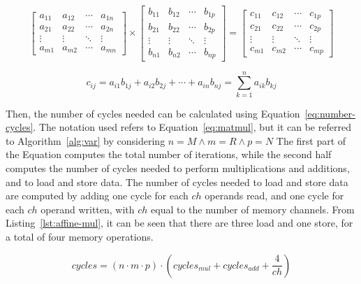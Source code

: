 \begin{equation}
        \label{eq:matmul}
    \begin{bmatrix}
     a_{11} & a_{12} & \cdots & a_{1n}\\
     a_{21} & a_{22} & \cdots & a_{2n}\\
     \vdots & \vdots & \ddots & \vdots\\
     a_{m1} & a_{m2} & \cdots & a_{mn}
 \end{bmatrix}
 \times
 \begin{bmatrix}
     b_{11} & b_{12} & \cdots & b_{1p}\\
     b_{21} & b_{22} & \cdots & b_{2p}\\
     \vdots & \vdots & \ddots & \vdots\\
     b_{n1} & b_{n2} & \cdots & b_{np}
 \end{bmatrix}
  =
 \begin{bmatrix}
     c_{11} & c_{12} & \cdots & c_{1p}\\
     c_{21} & c_{22} & \cdots & c_{2p}\\
     \vdots & \vdots & \ddots & \vdots\\
     c_{m1} & c_{m2} & \cdots & c_{mp}
 \end{bmatrix}
\end{equation}

\begin{equation}
    \label{eq:matmul-element}
    c_{ij}= a_{i1} b_{1j} + a_{i2} b_{2j} +\cdots+ a_{in} b_{nj} = \sum_{k=1}^n a_{ik}b_{kj}
\end{equation}

Then, the number of cycles needed can be calculated using Equation~\ref{eq:number-cycles}.
The notation used refers to Equation~\ref{eq:matmul}, but it can be referred to Algorithm~\ref{alg:var} by considering $n = M \land m=R \land p=N$
The first part of the Equation computes the total number of iterations, while the second half computes the number of cycles needed to perform multiplications and additions, and to load and store data.
The number of cycles needed to load and store data are computed by adding one cycle for each $ch$ operands read, and one cycle for each $ch$ operand written, with $ch$ equal to the number of memory channels.
From Listing~\ref{lst:affine-mul}, it can be seen that there are three load and one store, for a total of four memory operations.

\begin{equation}
    \label{eq:number-cycles}
    cycles = \left(  n \cdot m \cdot p \right) \cdot \left(  cycles_{mul} + cycles_{add} + \frac{4}{ch} \right)
\end{equation}

